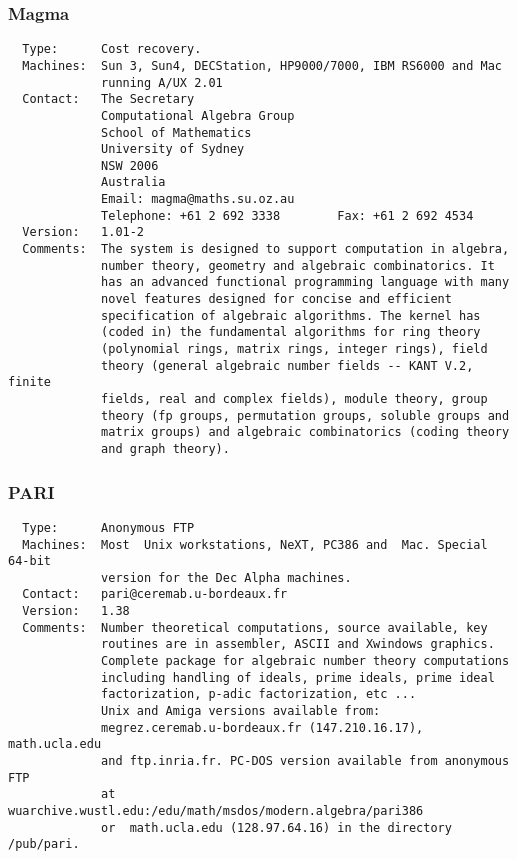 \documentclass[twoside,11pt]{article}
\begin{document}
\subsubsection{Magma}
\begin{verbatim}
  Type:      Cost recovery.
  Machines:  Sun 3, Sun4, DECStation, HP9000/7000, IBM RS6000 and Mac
             running A/UX 2.01
  Contact:   The Secretary
             Computational Algebra Group
             School of Mathematics
             University of Sydney
             NSW 2006
             Australia
             Email: magma@maths.su.oz.au
             Telephone: +61 2 692 3338        Fax: +61 2 692 4534
  Version:   1.01-2
  Comments:  The system is designed to support computation in algebra,
             number theory, geometry and algebraic combinatorics. It
             has an advanced functional programming language with many
             novel features designed for concise and efficient
             specification of algebraic algorithms. The kernel has
             (coded in) the fundamental algorithms for ring theory
             (polynomial rings, matrix rings, integer rings), field
             theory (general algebraic number fields -- KANT V.2, finite
             fields, real and complex fields), module theory, group
             theory (fp groups, permutation groups, soluble groups and
             matrix groups) and algebraic combinatorics (coding theory
             and graph theory).
\end{verbatim}

\subsubsection{PARI}
\begin{verbatim}
  Type:      Anonymous FTP
  Machines:  Most  Unix workstations, NeXT, PC386 and  Mac. Special 64-bit
             version for the Dec Alpha machines.
  Contact:   pari@ceremab.u-bordeaux.fr
  Version:   1.38
  Comments:  Number theoretical computations, source available, key
             routines are in assembler, ASCII and Xwindows graphics.
             Complete package for algebraic number theory computations
             including handling of ideals, prime ideals, prime ideal
             factorization, p-adic factorization, etc ...
             Unix and Amiga versions available from:
             megrez.ceremab.u-bordeaux.fr (147.210.16.17), math.ucla.edu
             and ftp.inria.fr. PC-DOS version available from anonymous FTP
             at wuarchive.wustl.edu:/edu/math/msdos/modern.algebra/pari386
             or  math.ucla.edu (128.97.64.16) in the directory /pub/pari.
\end{verbatim}
\end{document}
